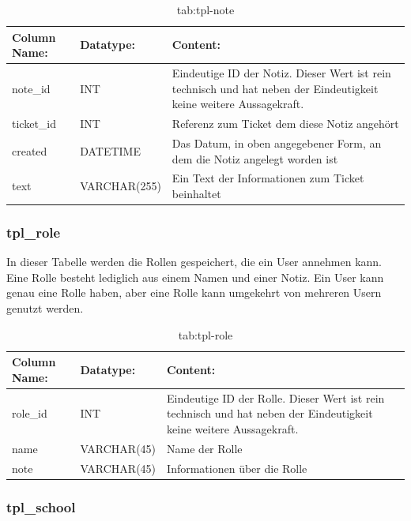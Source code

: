\begin{table}[h]
	\begin{tabular}{|p{3.5cm}|p{4cm}|p{6.2cm}|}
		\hline
		\textbf{Column Name:} & \textbf{Datatype:} & \textbf{Content:}\\
		\hline
		note\_id & INT & Eindeutige ID der Notiz. Dieser Wert ist rein technisch und hat neben der Eindeutigkeit keine weitere Aussagekraft.\\
		\hline
		ticket\_id & INT & Referenz zum Ticket dem diese Notiz angehört\\
		\hline
		created & DATETIME & Das Datum, in oben angegebener Form, an dem die Notiz angelegt worden ist\\
		\hline
		text & VARCHAR(255) & Ein Text der Informationen zum Ticket beinhaltet\\
		\hline
	\end{tabular}
	\caption{tab:tpl-note}
\end{table}
\label{tab:tpl_note}

\newpage

\subsubsection{tpl\_role}

In dieser Tabelle werden die Rollen gespeichert, die ein User annehmen kann. Eine Rolle besteht lediglich aus einem Namen und einer Notiz. Ein User kann genau eine Rolle haben, aber eine Rolle kann umgekehrt von mehreren Usern genutzt werden.

\begin{table}[h]
	\begin{tabular}{|p{3.5cm}|p{4cm}|p{6.2cm}|}
		\hline
		\textbf{Column Name:} & \textbf{Datatype:} & \textbf{Content:}\\
		\hline
		role\_id & INT & Eindeutige ID der Rolle. Dieser Wert ist rein technisch und hat neben der Eindeutigkeit keine weitere Aussagekraft.\\
		\hline
		name & VARCHAR(45) & Name der Rolle\\
		\hline
		note & VARCHAR(45) & Informationen über die Rolle\\
		\hline
	\end{tabular}
	\caption{tab:tpl-role}
\end{table}
\label{tab:tpl_role}


\subsubsection{tpl\_school}

